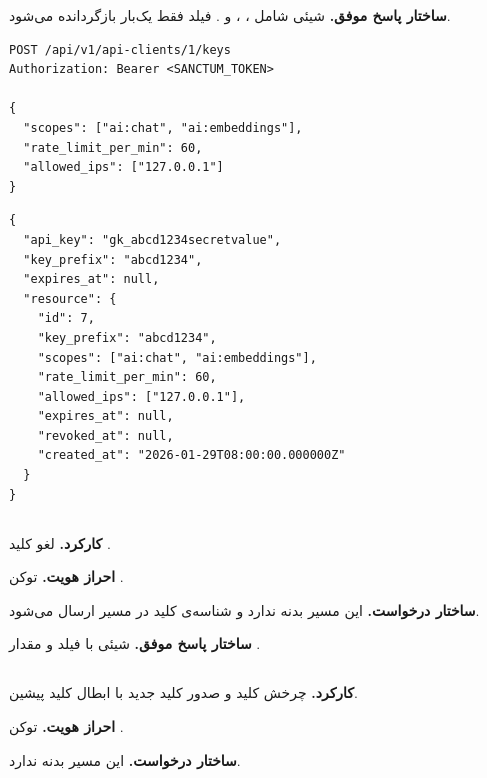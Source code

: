 \textbf{ساختار پاسخ موفق.} شیئی شامل ، ،
 و . فیلد  فقط یک‌بار
بازگردانده می‌شود.

\begin{latin}
\begin{lstlisting}[style=jsonStyle]
POST /api/v1/api-clients/1/keys
Authorization: Bearer <SANCTUM_TOKEN>

{
  "scopes": ["ai:chat", "ai:embeddings"],
  "rate_limit_per_min": 60,
  "allowed_ips": ["127.0.0.1"]
}
\end{lstlisting}
\end{latin}


\begin{latin}
\begin{lstlisting}[style=jsonStyle]
{
  "api_key": "gk_abcd1234secretvalue",
  "key_prefix": "abcd1234",
  "expires_at": null,
  "resource": {
    "id": 7,
    "key_prefix": "abcd1234",
    "scopes": ["ai:chat", "ai:embeddings"],
    "rate_limit_per_min": 60,
    "allowed_ips": ["127.0.0.1"],
    "expires_at": null,
    "revoked_at": null,
    "created_at": "2026-01-29T08:00:00.000000Z"
  }
}
\end{lstlisting}
\end{latin}


\subsection{}
\textbf{کارکرد.} لغو کلید .

\textbf{احراز هویت.} توکن .

\textbf{ساختار درخواست.} این مسیر بدنه ندارد و شناسه‌ی کلید در مسیر ارسال
می‌شود.

\textbf{ساختار پاسخ موفق.} شیئی با فیلد  و مقدار .

\subsection{}
\textbf{کارکرد.} چرخش کلید  و صدور کلید جدید با ابطال کلید پیشین.

\textbf{احراز هویت.} توکن .

\textbf{ساختار درخواست.} این مسیر بدنه ندارد.

